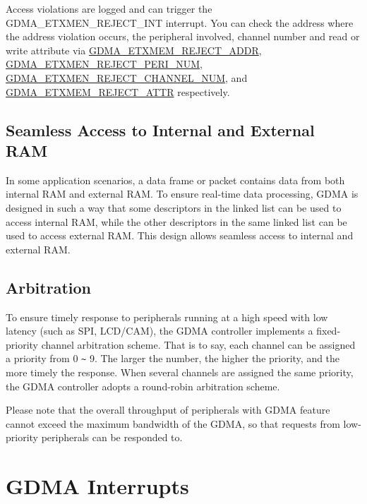 \documentclass[main\_\_EN.tex]{subfiles}
\begin{document}
Access violations are logged and can trigger the GDMA\_ETXMEN\_REJECT\_INT interrupt. You can check the address where the address violation occurs, the peripheral involved, channel number and read or write attribute via \hyperref[fielddesc:DMAEXTMEMREJECTADDR]{GDMA\_ETXMEM\_REJECT\_ADDR}, \hyperref[fielddesc:DMAEXTMEMREJECTPERINUM]{GDMA\_ETXMEN\_REJECT\_PERI\_NUM}, \hyperref[fielddesc:DMAEXTMEMREJECTCHANNELNUM]{GDMA\_ETXMEN\_REJECT\_CHANNEL\_NUM}, and \hyperref[fielddesc:DMAEXTMEMREJECTATRR]{GDMA\_ETXMEM\_REJECT\_ATTR} respectively.

\subsection{Seamless Access to Internal and External RAM}

In some application scenarios, a data frame or packet contains data from both internal RAM and external RAM. To ensure real-time data processing, GDMA is designed in such a way that some descriptors in the linked list can be used to access internal RAM, while the other descriptors in the same linked list can be used to access external RAM. This design allows seamless access to internal and external RAM.

\subsection{Arbitration}

To ensure timely response to peripherals running at a high speed with low latency (such as SPI, LCD/CAM), the GDMA controller implements a fixed-priority channel arbitration scheme. That is to say, each channel can be assigned a priority from 0 \verb+~+ 9. The larger the number, the higher the priority, and the more timely the response. When several channels are assigned the same priority, the GDMA controller adopts a round-robin arbitration scheme.

Please note that the overall throughput of peripherals with GDMA feature cannot exceed the maximum bandwidth of the GDMA, so that requests from low-priority peripherals can be responded to.


\section{GDMA Interrupts}
\end{document}
